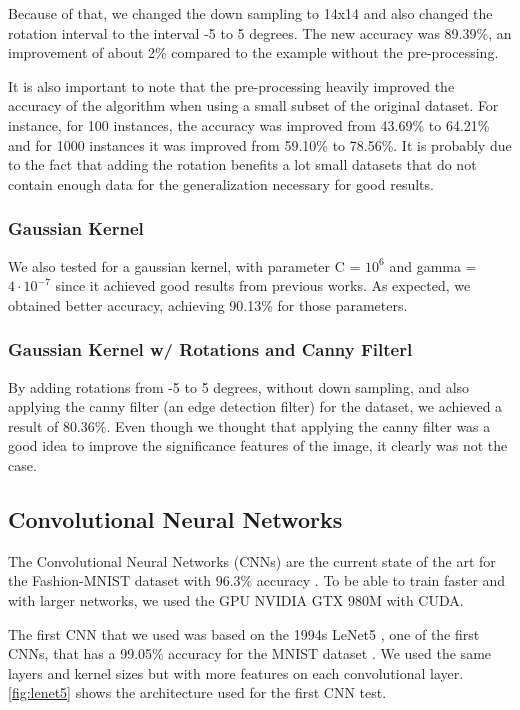 \documentclass[twoside,twocolumn]{article}
\begin{document}
Because of that, we changed the down sampling to 14x14 and also changed the rotation interval to the interval -5 to 5 degrees.
The new accuracy was 89.39\%, an improvement of about 2\% compared to the example without the pre-processing.

It is also important to note that the pre-processing heavily improved the accuracy of the algorithm when using a small subset of the
original dataset. For instance, for 100 instances, the accuracy was improved from 43.69\% to 64.21\% and for 1000 instances it was
improved from 59.10\% to 78.56\%. It is probably due to the fact that adding the rotation benefits a lot small datasets that do not contain
enough data for the generalization necessary for good results.

\subsubsection{Gaussian Kernel}

We also tested for a gaussian kernel, with parameter C = $10^6$ and gamma = $4  \cdot 10^{-7}$ since it achieved good results from previous works.
As expected, we obtained better accuracy, achieving 90.13\% for those parameters.

\subsubsection{Gaussian Kernel w/ Rotations and Canny Filterl}

By adding rotations from -5 to 5 degrees, without down sampling, and also applying the canny filter (an edge detection filter)
for the dataset, we achieved a result of 80.36\%. Even though we thought that applying the canny filter was a good idea to improve
the significance features of the image, it clearly was not the case.

\subsection{Convolutional Neural Networks}

     The Convolutional Neural Networks (CNNs) are the current state of the art for the Fashion-MNIST dataset with 96.3\% accuracy \cite{randomerasingdataaugmentationpaper}. To be able to train faster and with larger networks, we used the GPU NVIDIA GTX 980M with CUDA.
     
      The first CNN that we used was based on the 1994s LeNet5 \cite{yannLeCun:1998}, one of the first CNNs, that has a 99.05\% accuracy for the MNIST dataset \cite{yannLeCun:mnist}. We used the same layers and kernel sizes but with more features on each convolutional layer. \ref{fig:lenet5} shows the architecture used for the first CNN test.
\end{document}
